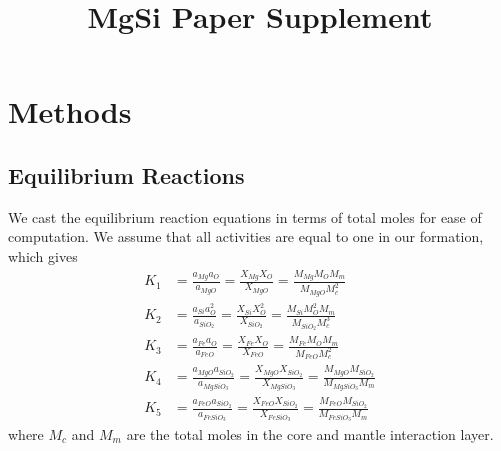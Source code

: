 \documentclass[]{article}
\date{}
\title{MgSi Paper Supplement}
\begin{document}
	
	\maketitle
	\section{Methods}\label{methods}
	
	
	\subsection{Equilibrium Reactions}\label{equilibrium-reactions}
	We cast the equilibrium reaction equations in terms of total moles for ease of computation. We assume that all activities are equal to one in our formation, which gives
	\begin{align}
	K_{1} &= \frac{a_{Mg}a_{O}}{ a_{MgO}} = \frac{X_{Mg} X_O }{X_{MgO}} = \frac{M_{Mg}M_{O}M_m}{M_{MgO}M_c^2}\\
	K_{2} &= \frac{a_{Si}a_{O}^2}{ a_{SiO_2}} = \frac{X_{Si} X_O^2 }{X_{SiO_2}} = \frac{M_{Si}M_{O}^2M_m}{M_{SiO_2}M_c^3}\\
	K_{3} &= \frac{a_{Fe}a_{O}}{ a_{FeO}} = \frac{X_{Fe} X_O }{X_{FeO}} = \frac{M_{Fe}M_{O}M_m}{M_{FeO}M_c^2}\\
	K_{4} &= \frac{a_{MgO}a_{SiO_2}}{ a_{MgSiO_3}} = \frac{X_{MgO} X_{SiO_2} }{X_{MgSiO_3}} = \frac{M_{MgO}M_{SiO_2}}{M_{MgSiO_3}M_m}​\\
	K_{5} &= \frac{a_{FeO}a_{SiO_2}}{ a_{FeSiO_3}} = \frac{X_{FeO} X_{SiO_2} }{X_{FeSiO_3}} = \frac{M_{FeO}M_{SiO_2}}{M_{FeSiO_3}M_m}
	\end{align}
	where $M_c$ and $M_m$ are the total moles in the core and mantle interaction layer. 
	
\end{document}
